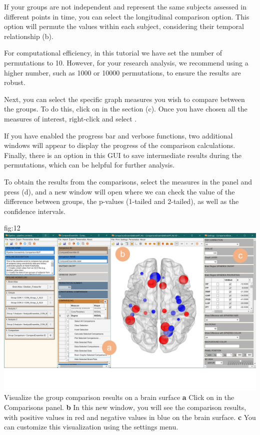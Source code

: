 \documentclass[justified]{tufte-handout}
\begin{document}
If your groups are not independent and represent the same subjects assessed in different points in time, you can select the longitudinal comparison option. This option will permute the values within each subject, considering their temporal relationship (b).

For computational efficiency, in this tutorial we have set the number of permutations to 10. However, for your research analysis, we recommend using a higher number, such as 1000 or 10000 permutations, to ensure the results are robust.

Next, you can select the specific graph measures you wish to compare between the groups. To do this, click on  in the  section (c). Once you have chosen all the measures of interest, right-click and select .

If you have enabled the progress bar and verbose functions, two additional windows will appear to display the progress of the comparison calculations. Finally, there is an option in this GUI to save intermediate results during the permutations, which can be helpful for further analysis.
 
To obtain the results from the comparisons, select the measures in the  panel and press  ({d}), and a new window will open where we can check the value of the difference between groups, the p-values (1-tailed and 2-tailed), as well as the confidence intervals.

{fig:12}
{
	\includegraphics{fig12.jpg}
}
{Visualize the group comparison results on a brain surface}
{
	{\bf a} Click on  in the Comparisons panel.
	{\bf b} In this new window, you will see the comparison results, with positive values in red and negative values in blue on the brain surface.
{\bf c} You can customize this visualization using the settings menu.
}
\end{document}
